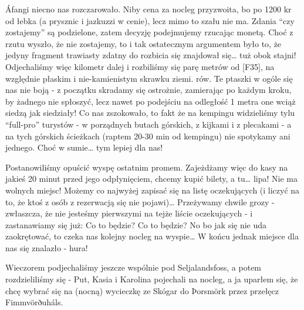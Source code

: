 Áfangi niecno nas rozczarowało. Niby cena za nocleg przyzwoita, bo po 1200 kr od łebka (a prysznic i jazkuzzi w cenie), lecz mimo to szału nie ma. Zdania “czy zostajemy” są podzielone, zatem decyzję podejmujemy rzucając monetą. Choć z rzutu wyszło, że nie zostajemy, to i tak ostatecznym argumentem było to, że jedyny fragment trawiasty zdatny do rozbicia się znajdował się… tuż obok stajni! Odjechaliśmy więc kilometr dalej i rozbiliśmy się parę metrów od [F35], na względnie płaskim i nie-kamienistym skrawku ziemi.
rów. Te ptaszki w ogóle się nas nie boją - z początku skradamy się ostrożnie, zamierając po każdym kroku, by żadnego nie spłoszyć, lecz nawet po podejściu na odległość 1 metra one wciąż siedzą jak siedziały! Co nas zszokowało, to fakt że na kempingu widzieliśmy tylu “full-pro” turystów - w porządnych butach górskich, z kijkami i z plecakami - a na tych górskich ścieżkach (raptem 20-30 min od kempingu) nie spotykamy ani jednego. Choć w sumie… tym lepiej dla nas!


Postanowiliśmy opuścić wyspę ostatnim promem. Zajeżdżamy więc do kasy na jakieś 20 minut przed jego odpłynięciem, chcemy kupić bilety, a tu… lipa! Nie ma wolnych miejsc! Możemy co najwyżej zapisać się na listę oczekujących (i liczyć na to, że ktoś z osób z rezerwacją się nie pojawi)… Przeżywamy chwile grozy - zwłaszcza, że nie jesteśmy pierwszymi na tejże liście oczekujących - i zastanawiamy się już: Co to będzie? Co to będzie? No bo jak się nie uda zaokrętować, to czeka nas kolejny nocleg na wyspie… W końcu jednak miejsce dla nas się znalazło - hura!



Wieczorem podjechaliśmy jeszcze wspólnie pod Seljalandsfoss, a potem rozdzieliliśmy się - Put, Kasia i Karolina pojechali na nocleg, a ja uparłem się, że chcę wybrać się na (nocną) wycieczkę ze Skógar do Þorsmörk przez przełęcz Fimmvörðuháls.